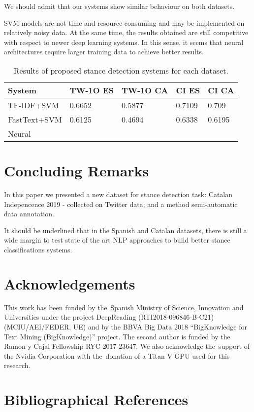 \documentclass[10pt, a4paper]{article}
\begin{document}
We should admit that our systems show similar behaviour on both datasets.  

SVM models are not time and resource consuming and may be implemented on relatively noisy data. At the same time, the results obtained are still competitive with respect to newer deep learning systems. In this sense, it seems that neural architectures require larger training data to achieve better results.



\begin{table}[t]
\begin{tabularx}{\textwidth}{|l|l|l|l|X|}
\hline
\textbf{System} & \textbf{TW-1O ES} & \textbf{TW-1O CA} & \textbf{CI ES}&\textbf{CI CA}\\
\hline
TF-IDF+SVM&0.6652&0.5877& 0.7109& 0.709\\ 
\hline
FastText+SVM&0.6125& 0.4694& 0.6338& 0.6195\\ 
\hline
Neural&           &          &       & \\ 
\hline
\end{tabularx}
\caption{Results of proposed stance detection systems for each dataset. }
\label{tab:dataset_compare}
\end{table}


\section{Concluding Remarks}

In this paper we presented a new dataset for stance detection task: Catalan Indepencence 2019 - collected on Twitter data; and a method semi-automatic data annotation.  

It should be underlined that in the Spanish and Catalan datasets, there is still a wide margin to test state of the art NLP approaches to build better stance classifications systems.

\section{Acknowledgements}
\label{sec:acknoledgements}

This work has been funded by the~Spanish Ministry of Science, Innovation and Universities under the project DeepReading (RTI2018-096846-B-C21) (MCIU/AEI/FEDER, UE) and by the BBVA Big Data 2018 ``BigKnowledge for Text Mining (BigKnowledge)'' project. The second author is funded by the Ramon y Cajal Fellowship RYC-2017-23647. We also acknowledge the~support of the Nvidia Corporation with the~donation of a Titan V GPU used for this research.

\section{Bibliographical References}\label{main:ref}





\end{document}
